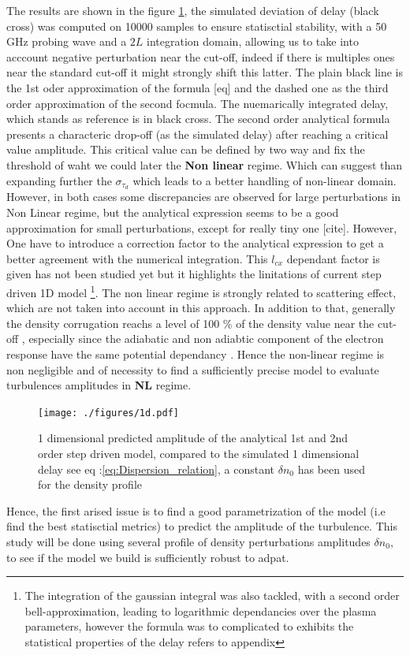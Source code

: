 \documentclass[11pt,a4paper,openany]{report}
\begin{document}
\begin{multicols}{2}
    The results are shown in the figure \ref{fig:std_delay}, the simulated deviation of delay (black cross) was computed on 10000 samples to ensure statisctial stability, with a 50 GHz probing wave and a $2L$ integration domain, allowing us to take into acccount negative perturbation near the cut-off, indeed if there is multiples ones near the standard cut-off it might strongly shift this latter. The plain black line is the 1st oder approximation of the formula [eq] and the dashed one as the third order approximation of the second focmula. The nuemarically integrated delay, which stands as reference is in black cross. The second order analytical formula presents a characteric drop-off (as the simulated delay) after reaching a critical value amplitude. This critical value can be defined by two way \cite{SPR_Krutkin, PUT} and fix the threshold of waht we could later the \textbf{Non linear} regime. Which can suggest than expanding further the $\sigma_{\tau_d}$ which leads to a better handling of non-linear domain. However, in both cases some discrepancies are observed for large perturbations in Non Linear regime, but the analytical expression seems to be a good approximation for small perturbations, except for really tiny one [cite]. However, One have to introduce a correction factor to the analytical expression to get a better agreement with the numerical integration. This $l_{cx}$ dependant factor is given has not been studied yet but it highlights the linitations of current step driven 1D model \footnote{The integration of the gaussian integral was also tackled, with a second order bell-approximation, leading to logarithmic dependancies over the plasma parameters, however the formula was to complicated to exhibits the statistical properties of the delay refers to appendix}. The non linear regime is strongly related to scattering effect, which are not taken into account in this approach. In addition to that, generally the density corrugation reachs a level of 100 \% of the density value near the cut-off \cite{Krutkin_thesis}, especially since the adiabatic and non adiabtic component of the electron response have the same potential dependancy \cite{San_diego}.   Hence the non-linear regime is non negligible and of necessity to find a sufficiently precise model to evaluate turbulences amplitudes in \textbf{NL} regime.

    \begin{figure}[H]
        \centering
        \hspace*{-1cm}\texttt{[image: ./figures/1d.pdf]}
        \caption{1 dimensional predicted amplitude of the analytical 1st and 2nd order step driven model, compared to the simulated 1 dimensional delay see eq :\ref{eq:Dispersion_relation}, a constant $\delta n_0$ has been used for the density profile}
        \label{fig:std_delay}
    \end{figure}
    Hence, the first arised issue is to find a good parametrization of the model (i.e find the best statisctial metrics) to predict the amplitude of the turbulence. This study will be done using several profile of density perturbations amplitudes $\delta n_0$, to see if the model we build is sufficiently robust to adpat.

\end{multicols}
\end{document}
